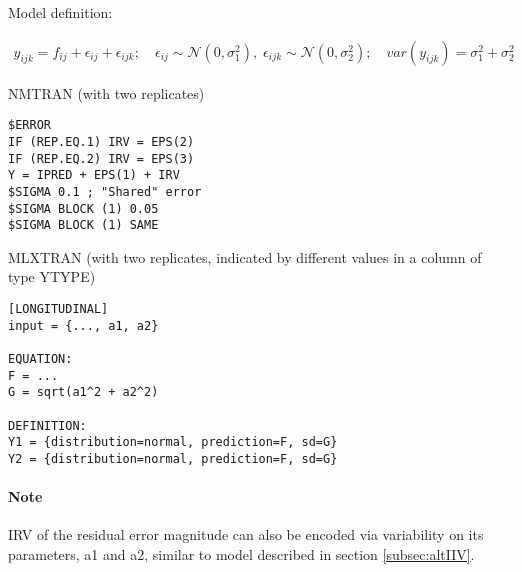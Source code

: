 \bigskip
Model definition:

\begin{eqnarray}
y_{ijk} = f_{ij} + \epsilon_{ij} + \epsilon_{ijk}; \quad 
\epsilon_{ij} \sim \mathcal{N}(0,\sigma_1^2), \; \epsilon_{ijk} \sim \mathcal{N}(0,\sigma_2^2); \quad var(y_{ijk}) = \sigma^2_{1} + \sigma^2_{2} \nonumber
\end{eqnarray}	

\bigskip

\begin{lrbox}{\lstbox}\begin{minipage}{16cm}
NMTRAN (with two replicates)
\begin{lstlisting}[frame=single,language=NM]
$ERROR
IF (REP.EQ.1) IRV = EPS(2)
IF (REP.EQ.2) IRV = EPS(3)
Y = IPRED + EPS(1) + IRV
$SIGMA 0.1 ; "Shared" error
$SIGMA BLOCK (1) 0.05
$SIGMA BLOCK (1) SAME
\end{lstlisting}   
\end{minipage}\end{lrbox}
\usebox\lstbox

\begin{lrbox}{\lstbox}\begin{minipage}{16cm}
MLXTRAN (with two replicates, indicated by different values in a column of type YTYPE)
\begin{lstlisting}[frame=single,language=MLX]
[LONGITUDINAL]
input = {..., a1, a2}

EQUATION:
F = ...
G = sqrt(a1^2 + a2^2)

DEFINITION:
Y1 = {distribution=normal, prediction=F, sd=G}
Y2 = {distribution=normal, prediction=F, sd=G}

\end{lstlisting}   
\end{minipage}\end{lrbox}
\usebox\lstbox

\paragraph{Note} IRV of the residual error magnitude can also be encoded via variability 
on its parameters, a1 and a2, similar to model described in section \ref{subsec:altIIV}.


